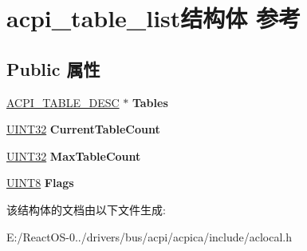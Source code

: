 \hypertarget{structacpi__table__list}{}\section{acpi\+\_\+table\+\_\+list结构体 参考}
\label{structacpi__table__list}
\subsection*{Public 属性}
\begin{DoxyCompactItemize}
\item 
\mbox{\label{structacpi__table__list_aa18abb657b5c3185eb43cc2145531335}} 
\hyperlink{structacpi__table__desc}{A\+C\+P\+I\+\_\+\+T\+A\+B\+L\+E\+\_\+\+D\+E\+SC} $\ast$ {\bfseries Tables}
\item 
\mbox{\label{structacpi__table__list_a5ce919726d1926b0d2c7da5ab351e444}} 
\hyperlink{_processor_bind_8h_ae1e6edbbc26d6fbc71a90190d0266018}{U\+I\+N\+T32} {\bfseries Current\+Table\+Count}
\item 
\mbox{\label{structacpi__table__list_ab8a59d69123b8727e289b55d35afe0bc}} 
\hyperlink{_processor_bind_8h_ae1e6edbbc26d6fbc71a90190d0266018}{U\+I\+N\+T32} {\bfseries Max\+Table\+Count}
\item 
\mbox{\label{structacpi__table__list_a08c4e9f8449d2a3d7cd1d16d2b8f307b}} 
\hyperlink{_processor_bind_8h_ab27e9918b538ce9d8ca692479b375b6a}{U\+I\+N\+T8} {\bfseries Flags}
\end{DoxyCompactItemize}


该结构体的文档由以下文件生成\+:\begin{DoxyCompactItemize}
\item 
E\+:/\+React\+O\+S-\/0../drivers/bus/acpi/acpica/include/aclocal.\+h\end{DoxyCompactItemize}
